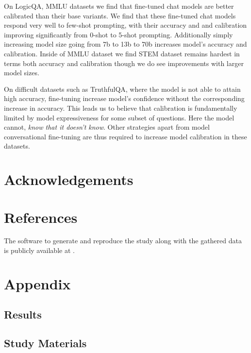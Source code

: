 \documentclass[11pt]{article}
\begin{document}
On LogicQA, MMLU datasets we find that fine-tuned chat models are better calibrated than their base variants.
We find that these fine-tuned chat models respond very well to few-shot prompting, with their accuracy and and calibration improving significantly from 0-shot to 5-shot prompting. Additionally simply increasing 
model size going from 7b to 13b to 70b increases model's accuracy and calibration. Inside of MMLU dataset we find  STEM dataset remains hardest in terms both accuracy and calibration though we do see improvements with larger model sizes.

On difficult datasets such as TruthfulQA, where the 
model is not able to attain high accuracy, fine-tuning 
increase model's confidence without the corresponding 
increase in accuracy. This leads us to believe that 
calibration is fundamentally limited by model 
expressiveness for some subset of questions. Here 
the model cannot, \emph{know that it doesn't know}. Other strategies apart from model conversational 
fine-tuning are thus required to increase model calibration in these datasets.

\section{Acknowledgements}


\section{References}

The software to generate and reproduce the study 
along with the gathered data is publicly available at \cite{Nair_Examining_Calibration_Large}.   




\appendix
\section{Appendix}

\subsection{Results}



\subsection{Study Materials}

\label{sec:appendix}
\end{document}
